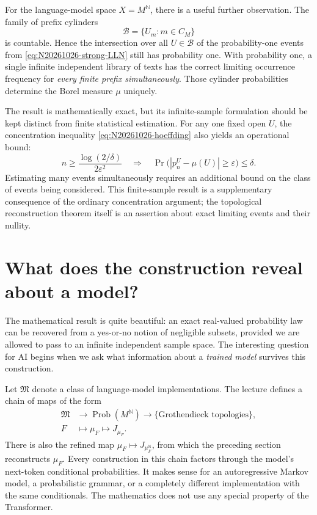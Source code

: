 For the language-model space \(X=M^{\mathbb N}\), there is a useful further observation. The family of prefix cylinders
\[
 \mathcal B=\{U_m:m\in C_M\}
\]
is countable. Hence the intersection over all \(U\in\mathcal B\) of the probability-one events from \eqref{eq:N20261026-strong-LLN} still has probability one. With probability one, a single infinite independent library of texts has the correct limiting occurrence frequency for \emph{every finite prefix simultaneously}. Those cylinder probabilities determine the Borel measure \(\mu\) uniquely.

The result is mathematically exact, but its infinite-sample formulation should be kept distinct from finite statistical estimation. For any one fixed open \(U\), the concentration inequality \eqref{eq:N20261026-hoeffding} also yields an operational bound:
\[
 n\geq\frac{\log(2/\delta)}{2\varepsilon^2}
 \quad\Longrightarrow\quad
 \Pr\bigl(|p_n^U-\mu(U)|\geq\varepsilon\bigr)\leq\delta.
\]
Estimating many events simultaneously requires an additional bound on the class of events being considered. This finite-sample result is a supplementary consequence of the ordinary concentration argument; the topological reconstruction theorem itself is an assertion about exact limiting events and their nullity.

\section{What does the construction reveal about a model?}

The mathematical result is quite beautiful: an exact real-valued probability law can be recovered from a yes-or-no notion of negligible subsets, provided we are allowed to pass to an infinite independent sample space. The interesting question for AI begins when we ask what information about a \emph{trained model} survives this construction.

Let \(\mathfrak M\) denote a class of language-model implementations. The lecture defines a chain of maps of the form
\begin{equation}
 \begin{aligned}
 \mathfrak M&\longrightarrow\operatorname{Prob}(M^{\mathbb N})
 \longrightarrow\{\text{Grothendieck topologies}\},\\
 F&\longmapsto\mu_F\longmapsto J_{\mu_F}.
 \end{aligned}
 \label{eq:N20261026-factorization}
\end{equation}
There is also the refined map \(\mu_F\mapsto J_{\mu_F^{\mathbb N}}\), from which the preceding section reconstructs \(\mu_F\). Every construction in this chain factors through the model's next-token conditional probabilities. It makes sense for an autoregressive Markov model, a probabilistic grammar, or a completely different implementation with the same conditionals. The mathematics does not use any special property of the Transformer.

